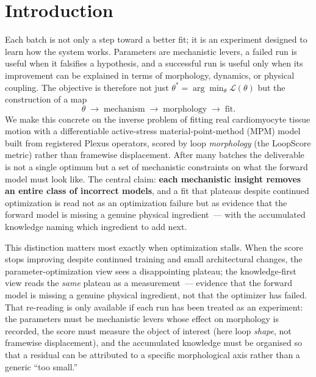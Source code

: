 \documentclass[11pt]{article}
\begin{document}
\section{Introduction}

Each batch is not only a step toward a better fit; it is an experiment designed to learn how the system works. Parameters are mechanistic levers, a failed run is useful when it falsifies a hypothesis, and a successful run is useful only when its improvement can be explained in terms of morphology, dynamics, or physical coupling. The objective is therefore not just $\theta^* = \arg\min_\theta \mathcal{L}(\theta)$ but the construction of a map
\[
\theta \;\longrightarrow\; \text{mechanism} \;\longrightarrow\; \text{morphology} \;\longrightarrow\; \text{fit}.
\]
We make this concrete on the inverse problem of fitting real cardiomyocyte tissue motion with a differentiable active-stress material-point-method (MPM) model built from registered Plexus operators, scored by loop \emph{morphology} (the LoopScore metric) rather than framewise displacement. After many batches the deliverable is not a single optimum but a set of mechanistic constraints on what the forward model must look like. The central claim: \textbf{each mechanistic insight removes an entire class of incorrect models}, and a fit that plateaus despite continued optimization is read not as an optimization failure but as evidence that the forward model is missing a genuine physical ingredient~--- with the accumulated knowledge naming which ingredient to add next.

This distinction matters most exactly when optimization stalls. When the score stops improving despite continued training and small architectural changes, the parameter-optimization view sees a disappointing plateau; the knowledge-first view reads the \emph{same} plateau as a measurement~--- evidence that the forward model is missing a genuine physical ingredient, not that the optimizer has failed. That re-reading is only available if each run has been treated as an experiment: the parameters must be mechanistic levers whose effect on morphology is recorded, the score must measure the object of interest (here loop \emph{shape}, not framewise displacement), and the accumulated knowledge must be organised so that a residual can be attributed to a specific morphological axis rather than a generic ``too small.''
\end{document}
